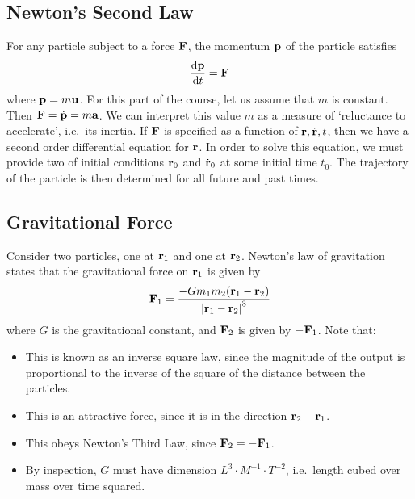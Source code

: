 \subsection{Newton's Second Law}
For any particle subject to a force \(\vb F\), the momentum \(\vb p\) of the particle satisfies
\[ \frac{\dd \vb p}{\dd{t}} = \vb F \]
where \(\vb p = m \vb u\). For this part of the course, let us assume that \(m\) is constant. Then \(\vb F = \dot{\vb p} = m \vb a\). We can interpret this value \(m\) as a measure of `reluctance to accelerate', i.e.\ its inertia. If \(\vb F\) is specified as a function of \(\vb r, \dot{\vb r}, t\), then we have a second order differential equation for \(\vb r\). In order to solve this equation, we must provide two of initial conditions \(\vb r_0\) and \(\dot{\vb r}_0\) at some initial time \(t_0\). The trajectory of the particle is then determined for all future and past times.

\subsection{Gravitational Force}
Consider two particles, one at \(\vb r_1\) and one at \(\vb r_2\). Newton's law of gravitation states that the gravitational force on \(\vb r_1\) is given by
\[ \vb F_1 = \frac{- G m_1 m_2 (\vb r_1 - \vb r_2)}{\abs{\vb r_1 - \vb r_2}^3} \]
where \(G\) is the gravitational constant, and \(\vb F_2\) is given by \(-\vb F_1\). Note that:
\begin{itemize}
	\item This is known as an inverse square law, since the magnitude of the output is proportional to the inverse of the square of the distance between the particles.
	\item This is an attractive force, since it is in the direction \(\vb r_2 - \vb r_1\).
	\item This obeys Newton's Third Law, since \(\vb F_2 = - \vb F_1\).
	\item By inspection, \(G\) must have dimension \(L^3 \cdot M^{-1} \cdot T^{-2}\), i.e.\ length cubed over mass over time squared.
\end{itemize}

